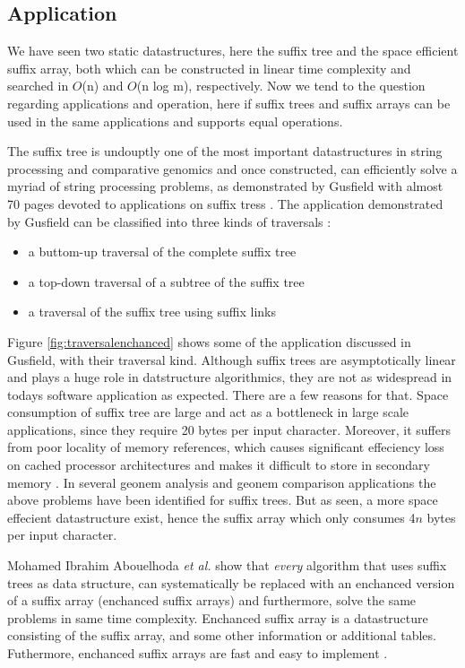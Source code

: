 \documentclass[12pt]{article} %
\begin{document}
\subsection{Application}

We have seen two static datastructures, here the suffix tree and the space efficient suffix array, both which can be constructed in linear time complexity and searched in $O$(n) and $O$(n log m), respectively. Now we tend to the question regarding applications and operation, here if suffix trees and suffix arrays can be used in the same applications and supports equal operations. 

The suffix tree is undouptly one of the most important datastructures in string processing and comparative genomics and once constructed, can efficiently solve a myriad of string processing problems, as demonstrated by Gusfield with almost 70 pages devoted to applications on suffix tress \cite{gusfield, enchancedsuffix}. The application demonstrated by Gusfield can be classified into three kinds of traversals \cite{enchancedsuffix}:
\begin{itemize}  
\item a buttom-up traversal of the complete suffix tree 
\item a top-down traversal of a subtree of the suffix tree 
\item a traversal of the suffix tree using suffix links 
\end{itemize}
Figure \ref{fig:traversalenchanced} shows some of the application discussed in Gusfield, with their traversal kind. Although suffix trees are asymptotically linear and plays a huge role in datstructure algorithmics, they are not as widespread in todays software application as expected. There are a few reasons for that. Space consumption of suffix tree are large and act as a bottleneck in large scale applications, since they require 20 bytes per input character. Moreover, it suffers from poor locality of memory references, which causes significant effeciency loss on cached processor architectures and makes it difficult to store in secondary memory \cite{enchancedsuffix}. In several geonem analysis and geonem comparison applications the above problems have been identified for suffix trees. But as seen, a more space effecient datastructure exist, hence the suffix array which only consumes 4$n$ bytes per input character\cite{enchancedsuffix}.   
 
Mohamed Ibrahim Abouelhoda \emph{et al.} \cite{enchancedsuffix} show that \emph{every} algorithm that uses suffix trees as data structure, can systematically be replaced with an enchanced version of a suffix array (enchanced suffix arrays) and furthermore, solve the same problems in same time complexity. Enchanced suffix array is a datastructure consisting of the suffix array, and some other information or additional tables. Futhermore, enchanced suffix arrays are fast and easy to implement \cite{enchancedsuffix}.
\end{document}
